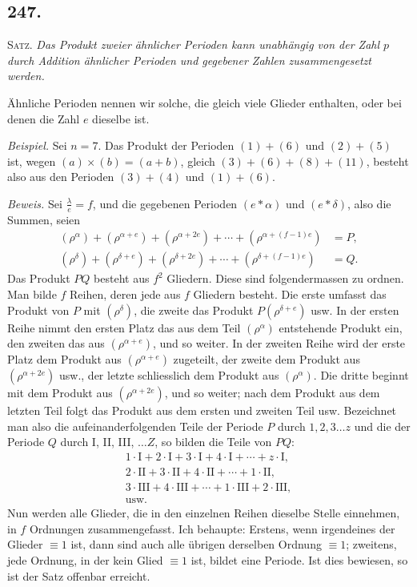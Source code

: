 \documentclass[12pt]{article}
\begin{document}
\subsection*{247.}
\textsc{Satz.} \textit{Das Produkt zweier ähnlicher Perioden kann unabhängig von der Zahl $p$ durch Addition ähnlicher Perioden und gegebener Zahlen zusammengesetzt werden.}

Ähnliche Perioden nennen wir solche, die gleich viele Glieder enthalten, oder bei denen die Zahl $e$ dieselbe ist.

\textit{Beispiel.} Sei $n=7$. Das Produkt der Perioden $(1)+(6)$ und $(2)+(5)$ ist, wegen $(a)\times(b)=(a+b)$, gleich $(3)+(6)+(8)+(11)$, besteht also aus den Perioden $(3)+(4)$ und $(1)+(6)$.

\textit{Beweis.} Sei $\frac{\lambda}{e}=f$, und die gegebenen Perioden $(e*\alpha)$ und $(e*\delta)$, also die Summen, seien
\[
\begin{aligned}
(\rho^\alpha)+(\rho^{\alpha+e})+(\rho^{\alpha+2e})+\cdots+(\rho^{\alpha+(f-1)e})&=P,\\
(\rho^\delta)+(\rho^{\delta+e})+(\rho^{\delta+2e})+\cdots+(\rho^{\delta+(f-1)e})&=Q.
\end{aligned}
\]
Das Produkt $PQ$ besteht aus $f^2$ Gliedern. Diese sind folgendermassen zu ordnen. Man bilde $f$ Reihen, deren jede aus $f$ Gliedern besteht. Die erste umfasst das Produkt von $P$ mit $(\rho^\delta)$, die zweite das Produkt $P(\rho^{\delta+e})$ usw. In der ersten Reihe nimmt den ersten Platz das aus dem Teil $(\rho^\alpha)$ entstehende Produkt ein, den zweiten das aus $(\rho^{\alpha+e})$, und so weiter. In der zweiten Reihe wird der erste Platz dem Produkt aus $(\rho^{\alpha+e})$ zugeteilt, der zweite dem Produkt aus $(\rho^{\alpha+2e})$ usw., der letzte schliesslich dem Produkt aus $(\rho^\alpha)$. Die dritte beginnt mit dem Produkt aus $(\rho^{\alpha+2e})$, und so weiter; nach dem Produkt aus dem letzten Teil folgt das Produkt aus dem ersten und zweiten Teil usw. Bezeichnet man also die aufeinanderfolgenden Teile der Periode $P$ durch $1,2,3\ldots z$ und die der Periode $Q$ durch I, II, III, $\ldots Z$, so bilden die Teile von $PQ$:
\[
\begin{array}{l}
1\cdot\mathrm{I}+2\cdot\mathrm{I}+3\cdot\mathrm{I}+4\cdot\mathrm{I}+\cdots+z\cdot\mathrm{I},\\
2\cdot\mathrm{II}+3\cdot\mathrm{II}+4\cdot\mathrm{II}+\cdots+1\cdot\mathrm{II},\\
3\cdot\mathrm{III}+4\cdot\mathrm{III}+\cdots+1\cdot\mathrm{III}+2\cdot\mathrm{III},\\
\text{usw.}
\end{array}
\]
Nun werden alle Glieder, die in den einzelnen Reihen dieselbe Stelle einnehmen, in $f$ Ordnungen zusammengefasst. Ich behaupte: Erstens, wenn irgendeines der Glieder $\equiv 1$ ist, dann sind auch alle übrigen derselben Ordnung $\equiv 1$; zweitens, jede Ordnung, in der kein Glied $\equiv 1$ ist, bildet eine Periode. Ist dies bewiesen, so ist der Satz offenbar erreicht.
\end{document}
